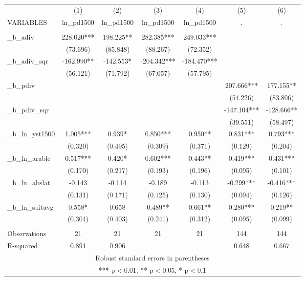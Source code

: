 \documentclass[]{article}
\begin{document}
\begin{tabular}{lcccccc} \hline
 & (1) & (2) & (3) & (4) & (5) & (6) \\
VARIABLES & ln\_pd1500 & ln\_pd1500 & ln\_pd1500 & ln\_pd1500 & . & . \\ \hline
 &  &  &  &  &  &  \\
\_b\_adiv & 228.020*** & 198.225** & 282.385*** & 249.033*** &  &  \\
 & (73.696) & (85.848) & (88.267) & (72.352) &  &  \\
\_b\_adiv\_sqr & -162.990** & -142.553* & -204.342*** & -184.470*** &  &  \\
 & (56.121) & (71.792) & (67.057) & (57.795) &  &  \\
\_b\_pdiv &  &  &  &  & 207.666*** & 177.155** \\
 &  &  &  &  & (54.226) & (83.806) \\
\_b\_pdiv\_sqr &  &  &  &  & -147.104*** & -128.666** \\
 &  &  &  &  & (39.551) & (58.497) \\
\_b\_ln\_yst1500 & 1.005*** & 0.939* & 0.850*** & 0.950** & 0.831*** & 0.793*** \\
 & (0.320) & (0.495) & (0.309) & (0.371) & (0.129) & (0.204) \\
\_b\_ln\_arable & 0.517*** & 0.420* & 0.602*** & 0.443** & 0.419*** & 0.431*** \\
 & (0.170) & (0.217) & (0.193) & (0.196) & (0.095) & (0.101) \\
\_b\_ln\_abslat & -0.143 & -0.114 & -0.189 & -0.113 & -0.299*** & -0.416*** \\
 & (0.131) & (0.171) & (0.125) & (0.130) & (0.094) & (0.126) \\
\_b\_ln\_suitavg & 0.558* & 0.658 & 0.489** & 0.661** & 0.280*** & 0.219** \\
 & (0.304) & (0.403) & (0.241) & (0.312) & (0.095) & (0.099) \\
 &  &  &  &  &  &  \\
Observations & 21 & 21 & 21 & 21 & 144 & 144 \\
 R-squared & 0.891 & 0.906 &  &  & 0.648 & 0.667 \\ \hline
\multicolumn{7}{c}{ Robust standard errors in parentheses} \\
\multicolumn{7}{c}{ *** p$<$0.01, ** p$<$0.05, * p$<$0.1} \\
\end{tabular}
\end{document}
